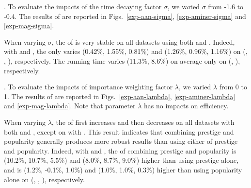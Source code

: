 



.
To evaluate the impacts of the time decaying factor $\sigma$, we varied $\sigma$ from -1.6 to -0.4.
The results of \PairAcc are reported in Figs.~\ref{exp-aan-sigma}, \ref{exp-aminer-sigma} and \ref{exp-mag-sigma}.


When varying $\sigma$, the \PairAcc of \ensemblerank is very stable on all datasets using both \recom and \fcita. Indeed, with \recom and \fcita, the \PairAcc only varies (0.42\%, 1.55\%, 0.81\%) and (1.26\%, 0.96\%, 1.16\%) on (\aan, \aminer, \magdata), respectively.
%
The running time varies (11.3\%, 8.6\%) on average only on (\aminer, \magdata), respectively.




.
To evaluate the impacts of importance weighting factor $\lambda$, we varied $\lambda$ from 0 to 1.
The results of \PairAcc are reported in Figs.~\ref{exp-aan-lambda}, \ref{exp-aminer-lambda} and \ref{exp-mag-lambda}. Note that parameter $\lambda$ has no impacts on efficiency.

When varying $\lambda$, the \PairAcc of \ensemblerank first increases and then decreases on all datasets with both \fcita and \recom, except on \aminer with \recom.
This result indicates that combining prestige and popularity generally produces more robust results than using either of prestige and popularity.
Indeed, with \recom and \fcita, the \PairAcc of combining prestige and popularity is (10.2\%, 10.7\%, 5.5\%) and (8.0\%, 8.7\%, 9.0\%) higher than using prestige alone, and is (1.2\%, -0.1\%, 1.0\%) and (1.0\%, 1.0\%, 0.3\%) higher than using popularity alone on (\aan, \aminer, \magdata), respectively.


